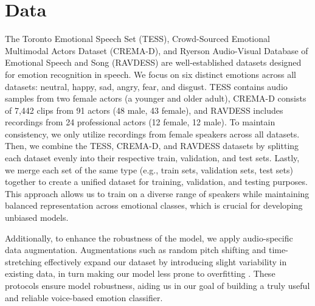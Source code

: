 \documentclass[../main.tex]{subfiles}
\begin{document}
\section{Data}
The Toronto Emotional Speech Set (TESS), Crowd-Sourced Emotional Multimodal Actors Dataset (CREMA-D), and Ryerson Audio-Visual Database of Emotional Speech and Song
(RAVDESS) are well-established datasets designed for emotion recognition in speech. We focus on six distinct emotions across all datasets: neutral, happy, sad, angry,
fear, and disgust. TESS contains audio samples from two female actors (a younger and older adult), CREMA-D consists of 7,442 clips from 91 actors (48 male, 43 female),
and RAVDESS includes recordings from 24 professional actors (12 female, 12 male). To maintain consistency, we only utilize recordings from female speakers across all
datasets. Then, we combine the TESS, CREMA-D, and RAVDESS datasets by splitting each dataset evenly into their respective train, validation, and test sets. Lastly, we
merge each set of the same type (e.g., train sets, validation sets, test sets) together to create a unified dataset for training, validation, and testing purposes.
This approach allows us to train on a diverse range of speakers while maintaining balanced representation across emotional classes, which is crucial for developing
unbiased models.

Additionally, to enhance the robustness of the model, we apply audio-specific
data augmentation. Augmentations such as random pitch shifting and
time-stretching effectively expand our dataset by introducing slight variability
in existing data, in turn making our model less prone to overfitting 
\citep{Bhatlawande2024}. These protocols ensure model robustness, aiding us in 
our goal of building a truly useful and reliable voice-based emotion classifier.
\end{document}
